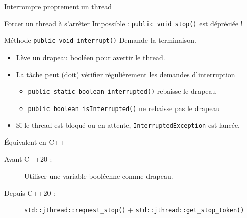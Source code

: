 
\begingroup

\begin{frame}[fragile]{Interrompre proprement un thread}

  \begin{alertblock}{Forcer un thread à s'arrêter}
    Impossible : \lstinline|public void stop()| est dépréciée !
  \end{alertblock}

  \vfill

  \begin{block}{Méthode \lstinline|public void interrupt()|}
    Demande la terminaison.
    \begin{itemize}
    \item Lève un drapeau booléen pour avertir le thread.
    \item La tâche peut (doit) vérifier régulièrement les demandes d'interruption
      \begin{itemize}
      \item \lstinline|public static boolean interrupted()| \hfill rebaisse le drapeau
      \item \lstinline|public boolean isInterrupted()|      \hfill ne rebaisse pas le drapeau
      \end{itemize}
    \item Si le thread est bloqué ou en attente,  \lstinline|InterruptedException| est lancée.
    \end{itemize}
  \end{block}

  \vfill

  \begin{exampleblock}{Équivalent en C++}
    \begin{description}
    \item[Avant C++20 :] Utiliser une variable booléenne comme drapeau.
    \item[Depuis C++20 :] \lstinline{std::jthread::request_stop()} + \lstinline{std::jthread::get_stop_token()}
    \end{description}
  \end{exampleblock}

\end{frame}

\endgroup
\endinput
